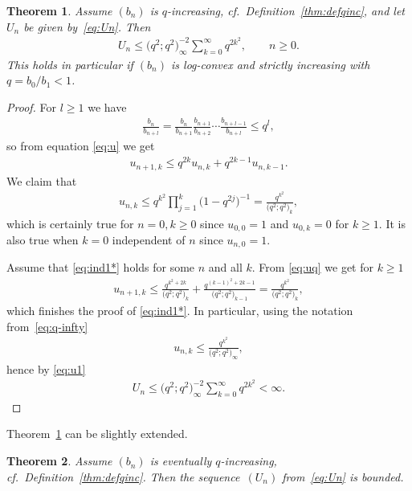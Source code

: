 \documentclass[pdftex]{sigma}
\numberwithin{equation}{section}
\newtheorem{thm}{Theorem}[section]
\begin{document}
\begin{thm}\label{thm:logconvex}Assume $(b_n)$ is $q$-increasing, cf.\ Definition~{\rm \ref{thm:defqinc}}, and let $U_n$ be given by~\eqref{eq:Un}. Then
 \begin{gather*}%
U_n\le \big(q^2;q^2\big)_\infty^{-2} \sum_{k=0}^{\infty}q^{2k^2},\qquad n\ge 0.
\end{gather*}
This holds in particular if $(b_n)$ is log-convex and strictly increasing with $q=b_0/b_1<1$.
\end{thm}

\begin{proof}For $l\ge 1$ we have
\begin{gather}\label{eq:logcv-q}
\frac{b_n}{b_{n+l}}=\frac{b_n}{b_{n+1}}\frac{b_{n+1}}{b_{n+2}}\cdots\frac{b_{n+l-1}}{b_{n+l}}\le q^l,
\end{gather}
 so from equation \eqref{eq:u} we get
\begin{gather}\label{eq:uq}
u_{n+1,k}\le q^{2k} u_{n,k}+q^{2k-1}u_{n,k-1}.
\end{gather}
We claim that
\begin{gather}\label{eq:ind1*}
u_{n,k}\le q^{k^2}\prod_{j=1}^k\big(1-q^{2j}\big)^{-1}=\frac{q^{k^2}}{\big(q^2;q^2\big)_k},
\end{gather}
which is certainly true for $n=0,k\ge 0$ since $u_{0,0}=1$ and $u_{0,k}=0$ for $k\ge 1$. It is also true when $k=0$ independent of $n$ since $u_{n,0}=1$.

Assume that \eqref{eq:ind1*} holds for some $n$ and all $k$. From \eqref{eq:uq} we get for $k\ge 1$
\begin{gather*}
u_{n+1,k}\le \frac{q^{k^2+2k}}{\big(q^2;q^2\big)_k}+\frac{q^{(k-1)^2+2k-1}}{\big(q^2;q^2\big)_{k-1}}=\frac{q^{k^2}}{\big(q^2;q^2\big)_k},
\end{gather*}
which finishes the proof of \eqref{eq:ind1*}. In particular, using the notation from~\eqref{eq:q-infty}
\begin{gather*}
u_{n,k}\le \frac{q^{k^2}}{\big(q^2;q^2\big)_\infty},
\end{gather*}
hence by \eqref{eq:u1}
\begin{gather*}
U_n\le \big(q^2;q^2\big)_\infty^{-2} \sum_{k=0}^{\infty}q^{2k^2}<\infty.\tag*{\qed}
\end{gather*}\renewcommand{\qed}{}
\end{proof}

Theorem~\ref{thm:logconvex} can be slightly extended.

\begin{thm}\label{thm:evtlogconvex} Assume $(b_n)$ is eventually $q$-increasing, cf.\ Definition~{\rm \ref{thm:defqinc}}. Then the sequen\-ce~$(U_n)$ from~\eqref{eq:Un} is bounded.
\end{thm}
\end{document}
